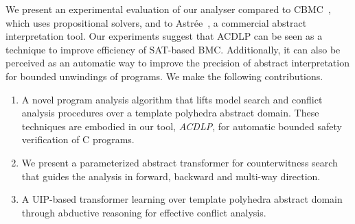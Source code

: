 We present an experimental evaluation of our analyser compared 
to CBMC~\cite{cbmc.tacas:2004}, which uses propositional solvers, and to 
Astr{\'e}e~\cite{DBLP:conf/pldi/BlanchetCCFMMMR03}, a commercial abstract 
interpretation tool.  Our experiments suggest that ACDLP can be seen as a 
technique to improve efficiency of SAT-based BMC. Additionally, it can 
also be perceived as an automatic way to improve the precision of abstract 
interpretation for bounded unwindings of programs.  We make the following 
contributions.
%
\vspace{-3mm}
\begin{enumerate}
\item A novel program analysis algorithm that lifts model search and conflict
analysis procedures over a template polyhedra abstract domain. These techniques
are embodied in our tool, \emph{ACDLP}, for automatic bounded 
safety verification of C programs.
\item We present a parameterized abstract transformer for counterwitness 
  search that guides the analysis in forward, backward and multi-way direction.
\item A UIP-based transformer learning over template polyhedra abstract domain 
  through abductive reasoning for effective conflict analysis. 
\end{enumerate}
%





